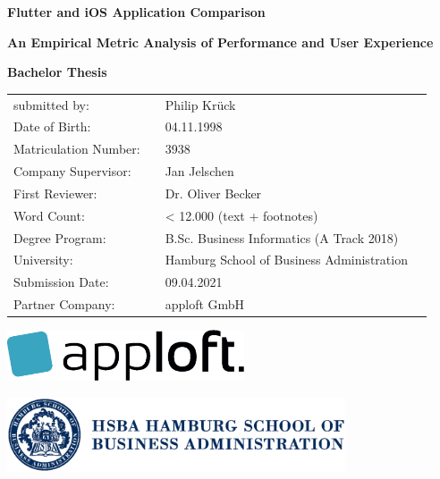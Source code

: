 \thispagestyle{empty}                  %


\begin{center}                         

\textbf{\Huge Flutter and iOS Application Comparison}

\textbf{\large An Empirical Metric Analysis of Performance and User Experience}

\vspace{5cm}

\textbf{\huge Bachelor Thesis}

\vspace{2cm}



\large\centering\doublespacing
\hspace{1.3cm}\begin{tabular}{p{4.2cm}p{0.3cm} p{8.7cm}l}
submitted by: & & Philip Krück\\
Date of Birth: & & 04.11.1998\\
Matriculation Number: & & 3938\\
Company Supervisor: & & Jan Jelschen\\
First Reviewer: & & Dr. Oliver Becker\\
Word Count: & & < 12.000 (text + footnotes) \\
Degree Program: & & B.Sc. Business Informatics (A Track 2018)\\
University: & & Hamburg School of Business Administration\\
Submission Date: & & 09.04.2021\\
Partner Company: & & apploft GmbH\\
\end{tabular}


\vspace{2cm}

\includegraphics[width=7cm]{images/apploft.eps} %

\vspace{0.5cm}

\includegraphics[width=10cm]{images/hsba.eps} %

\end{center}
